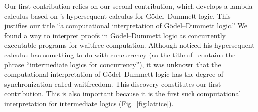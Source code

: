 Our first contribution relies on our second contribution, which
develops a lambda calculus based on \citet{avron91}'s hypersequent
calculus for G\"odel--Dummett logic.  This justifies our title ``a
computational interpretation of G\"odel--Dummett logic.''
We found a way to interpret proofs in G\"odel--Dummett logic as
concurrently executable programs for waitfree computation.
Although \citet{avron91} noticed his hypersequent calculus has something
to do with concurrency (as the title of~\citep{avron91} contains the phrase
``intermediate logics for concurrency''), it was unknown that
the computational interpretation of G\"odel--Dummett logic has
the degree of synchronization called waitfreedom.  This discovery
constitutes our first contribution.
This is also important because it is the first such computational
interpretation for intermediate logics (Fig.~\ref{fig:lattice}).
